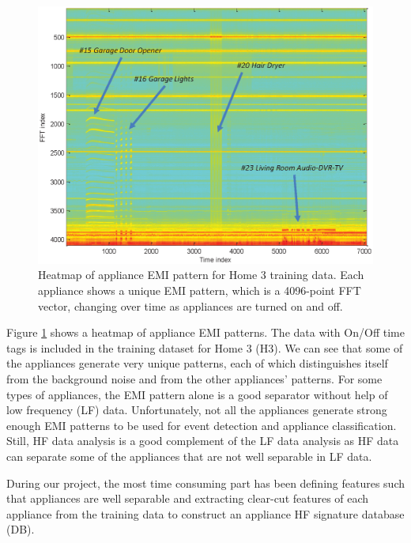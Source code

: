 \documentclass[11pt, letterpaper]{article}
\begin{document}
\begin{figure}[H]
\begin{center}
\includegraphics[width=5.0in]{H3_heatmap.eps}
  \caption{Heatmap of appliance EMI pattern for Home 3 training data. Each appliance shows a unique EMI pattern, which is a 4096-point FFT vector, changing over time as appliances are turned on and off.}
  \label{fig:H3_heatmap}
\end{center}
\end{figure}
Figure \ref{fig:H3_heatmap} shows a heatmap of appliance EMI patterns. The data with On/Off time tags is included in the training dataset for Home 3 (H3). We can see that some of the appliances generate very unique patterns, each of which distinguishes itself from the background noise and from the other appliances' patterns. For some types of appliances, the EMI pattern alone is a good separator without help of low frequency (LF) data. Unfortunately, not all the appliances generate strong enough EMI patterns to be used for event detection and appliance classification. Still, HF data analysis is a good complement of the LF data analysis as HF data can separate some of the appliances that are not well separable in LF data.

During our project, the most time consuming part has been defining features such that appliances are well separable and extracting clear-cut features of each appliance from the training data to construct an appliance HF signature database (DB).
\end{document}
